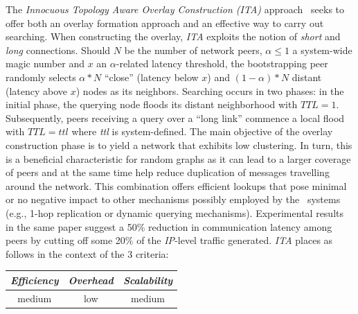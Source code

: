 The \emph{Innocuous Topology Aware Overlay Construction (ITA)}
approach~\cite{PRFM2009} seeks to offer both an overlay formation approach and
an effective way to carry out searching. When constructing the overlay,
\emph{ITA} exploits the notion of \emph{short} and \emph{long} connections.
Should $N$ be the number of network peers,  $\alpha \leq 1 $ a system-wide magic
number and $x$ an $\alpha$-related latency threshold, the bootstrapping peer
randomly selects $\alpha \ast N$ ``close'' (latency below $x$) and 
$\left( 1 - \alpha \right) \ast N$ distant (latency above $x$) nodes
as its neighbors.
Searching occurs in two phases: in the initial phase, the querying node
floods its distant neighborhood  with $TTL = 1$.
Subsequently, peers receiving a query over a ``long link'' commence a 
local flood with $TTL=ttl$ where \emph{ttl} is system-defined.
The main objective of the overlay construction phase is to yield a network that
exhibits low clustering. In turn, this is a beneficial characteristic for
random graphs as it can lead to a larger coverage of peers and at the same time
help reduce duplication of messages travelling around the network. This
combination offers efficient lookups that pose minimal or no negative impact to
other mechanisms possibly employed by the \p\ systems (e.g., 1-hop replication
or dynamic querying mechanisms). Experimental results in the same paper suggest
a 50\% reduction in communication latency among peers by cutting off some 20\%
of the \emph{IP}-level traffic generated.
\emph{ITA} places as follows in the context of the $3$ criteria:
%
\begin{center}
{\footnotesize
\begin{tabular}{ccc}
\emph{Efficiency} & \emph{Overhead} & \emph{Scalability} \\
\hline
medium &
low &
medium
\end{tabular}
}
\end{center}

